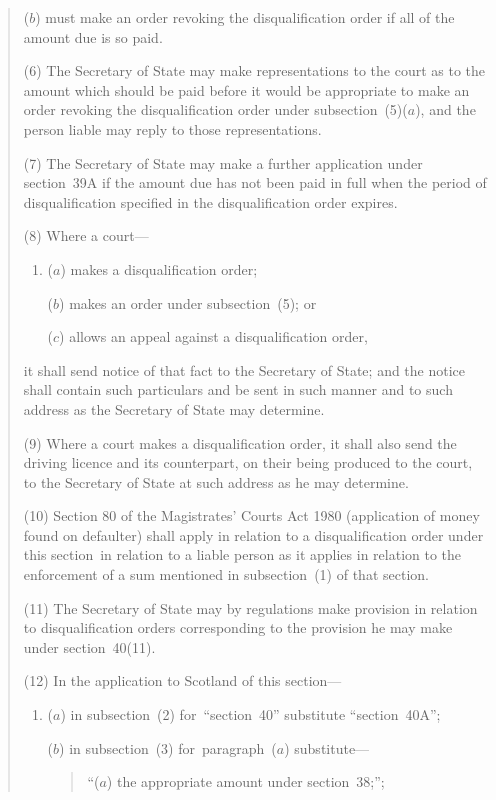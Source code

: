 \documentclass[12pt,a4paper]{article}
\begin{document}
\begin{quotation}
\begin{enumerate}
($b$) must make an order revoking the disqualification order if all of the amount due is so paid.
\end{enumerate}

(6) The Secretary of State may make representations to the court as to the amount which should be paid before it would be appropriate to make an order revoking the disqualification order under subsection~(5)($a$), and the person liable may reply to those representations.

(7) The Secretary of State may make a further application under section~39A if the amount due has not been paid in full when the period of disqualification specified in the disqualification order expires.

(8) Where a court—
\begin{enumerate}\item[]
($a$) makes a disqualification order;

($b$) makes an order under subsection~(5); or

($c$) allows an appeal against a disqualification order,
\end{enumerate}
it shall send notice of that fact to the Secretary of State; and the notice shall contain such particulars and be sent in such manner and to such address as the Secretary of State may determine.

(9) Where a court makes a disqualification order, it shall also send the driving licence and its counterpart, on their being produced to the court, to the Secretary of State at such address as he may determine.

(10) Section 80 of the Magistrates' Courts Act 1980 (application of money found on defaulter) shall apply in relation to a disqualification order under this section~in relation to a liable person as it applies in relation to the enforcement of a sum mentioned in subsection~(1)  of that section.

(11) The Secretary of State may by regulations make provision in relation to disqualification orders corresponding to the provision he may make under section~40(11).

(12) In the application to Scotland of this section—
\begin{enumerate}\item[]
\begin{sloppypar}
($a$) in subsection~(2)  for~“section~40” substitute “section~40A”;
\end{sloppypar}

($b$) in subsection~(3)  for~paragraph~($a$)  substitute—
\begin{quotation}
“($a$) the appropriate amount under section~38;”;
\end{quotation}


\end{enumerate}
\end{quotation}
\end{document}
